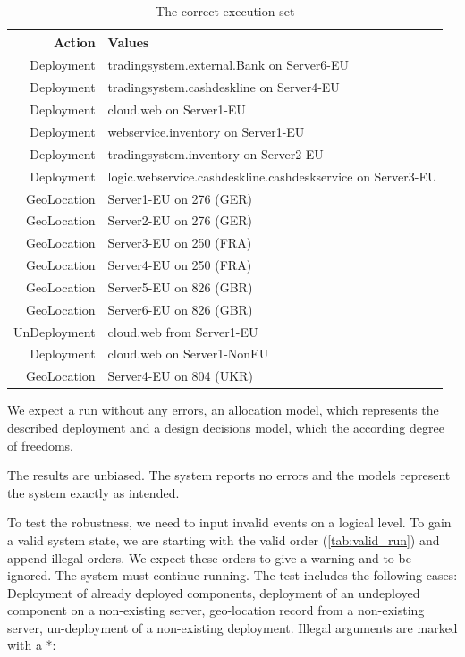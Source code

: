 \begin{table}[h]
	\centering
	\begin{tabular}{r | l}
		\hline
		\textbf{Action} & \textbf{Values}\\
		\hline
		Deployment & tradingsystem.external.Bank on Server6-EU\\
		Deployment & tradingsystem.cashdeskline on Server4-EU\\
		Deployment & cloud.web on Server1-EU\\
		Deployment & webservice.inventory on Server1-EU\\
		Deployment & tradingsystem.inventory on Server2-EU\\
		Deployment & logic.webservice.cashdeskline.cashdeskservice on Server3-EU\\
		GeoLocation & Server1-EU on 276 (GER)\\
		GeoLocation & Server2-EU on 276 (GER)\\
		GeoLocation & Server3-EU on 250 (FRA)\\
		GeoLocation & Server4-EU on 250 (FRA)\\
		GeoLocation & Server5-EU on 826 (GBR)\\
		GeoLocation & Server6-EU on 826 (GBR)\\
		UnDeployment & cloud.web from Server1-EU\\
		Deployment & cloud.web on Server1-NonEU\\
		GeoLocation & Server4-EU on 804 (UKR)\\
		\hline
		\end{tabular}
	\caption{The correct execution set}
	\label{tab:valid_run}
\end{table}

We expect a run without any errors, an allocation model, which represents the described deployment and a design decisions model, which the according degree of freedoms.

The results are unbiased. The system reports no errors and the models represent the system exactly as intended.

To test the robustness, we need to input invalid events on a logical level. To gain a valid system state, we are starting with the valid order (\autoref{tab:valid_run}) and append illegal orders. We expect these orders to give a warning and to be ignored. The system must continue running. The test includes the following cases: Deployment of already deployed components, deployment of an undeployed component on a non-existing server, geo-location record from a non-existing server, un-deployment of a non-existing deployment. Illegal arguments are marked with a *:

